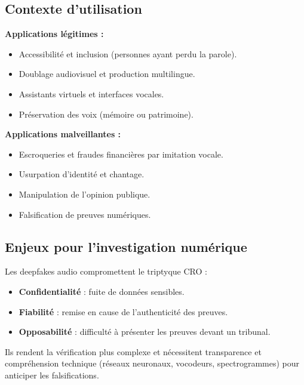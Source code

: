 \documentclass[12pt]{article}
\begin{document}
\begin{center}
\subsection*{Contexte d'utilisation}
\textbf{Applications légitimes :}
\begin{itemize}[leftmargin=*, label=\textbullet]
    \item Accessibilité et inclusion (personnes ayant perdu la parole).
    \item Doublage audiovisuel et production multilingue.
    \item Assistants virtuels et interfaces vocales.
    \item Préservation des voix (mémoire ou patrimoine).
\end{itemize}

\textbf{Applications malveillantes :}
\begin{itemize}[leftmargin=*, label=\textbullet]
    \item Escroqueries et fraudes financières par imitation vocale.
    \item Usurpation d'identité et chantage.
    \item Manipulation de l'opinion publique.
    \item Falsification de preuves numériques.
\end{itemize}

\subsection{Enjeux pour l’investigation numérique}
Les deepfakes audio compromettent le triptyque CRO :
\begin{itemize}[leftmargin=*, label=\textbullet]
    \item \textbf{Confidentialité} : fuite de données sensibles.
    \item \textbf{Fiabilité} : remise en cause de l'authenticité des preuves.
    \item \textbf{Opposabilité} : difficulté à présenter les preuves devant un tribunal.
\end{itemize}
Ils rendent la vérification plus complexe et nécessitent transparence et compréhension technique (réseaux neuronaux, vocodeurs, spectrogrammes) pour anticiper les falsifications.


\end{center}
\end{document}
